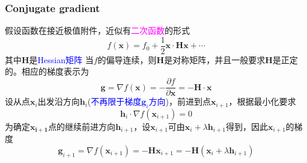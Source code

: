 \frame
{
	\frametitle{\textrm{Conjugate gradient}}
	假设函数在接近极值附件，近似有\textcolor{magenta}{二次函数}的形式
	\begin{displaymath}
		f(\mathbf{x})=f_0+\frac12\mathbf{x}\cdot\mathbf{H}{\mathbf{x}}+\cdots
	\end{displaymath}
	其中$\mathbf{H}$是\textcolor{blue}{\textrm{Hessian}矩阵}%
	当$f$的偏导连续，则$\mathbf{H}$是对称矩阵，并且一般要求$\mathbf{H}$是正定的。相应的梯度表示为
	\begin{displaymath}
		\mathbf{g}=\nabla f(\mathbf{x})=-\dfrac{\partial f}{\partial\mathbf{x}}=-\mathbf{H}\cdot\mathbf{x}
	\end{displaymath}
	\vskip 20pt
	设从点$\mathbf{x}_i$出发沿方向$\mathbf{h}_i$(\textcolor{blue}{不再限于梯度$\mathbf{g}_i$方向})，前进到点$\mathbf{x}_{i+1}$，根据最小化要求
	\begin{displaymath}
		\mathbf{h}_i\cdot\nabla f(\mathbf{x}_{i+1})=0
	\end{displaymath}
	为确定$\mathbf{x_{i+1}}$点的继续前进方向$\mathbf{h}_{i+1}$，设$\mathbf{x}_{i+1}$可由$\mathbf{x}_i+\lambda\mathbf{h}_{i+1}$得到，因此$\mathbf{x}_{i+1}$的梯度
	\begin{displaymath}
		\mathbf{g}_{i+1}=\nabla f(\mathbf{x}_{i+1})=-\mathbf{H}\mathbf{x}_{i+1}=-\mathbf{H}(\mathbf{x}_{i}+\lambda\mathbf{h}_{i+1})
	\end{displaymath}
}

